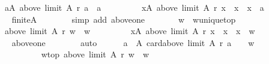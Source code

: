 \begin{isabellebody}
\ \ \ \ \ \ {\isachardoublequoteopen}{\isasymexists}a{\isasymin}A{\isachardot}{\kern0pt}\ above\ {\isacharparenleft}{\kern0pt}limit\ A\ r{\isacharparenright}{\kern0pt}\ a\ {\isacharequal}{\kern0pt}\ {\isacharbraceleft}{\kern0pt}a{\isacharbraceright}{\kern0pt}\ {\isasymand}\isanewline
\ \ \ \ \ \ \ \ {\isacharparenleft}{\kern0pt}{\isasymforall}x{\isasymin}A{\isachardot}{\kern0pt}\ above\ {\isacharparenleft}{\kern0pt}limit\ A\ r{\isacharparenright}{\kern0pt}\ x\ {\isacharequal}{\kern0pt}\ {\isacharbraceleft}{\kern0pt}x{\isacharbraceright}{\kern0pt}\ {\isasymlongrightarrow}\ x\ {\isacharequal}{\kern0pt}\ a{\isacharparenright}{\kern0pt}{\isachardoublequoteclose}\isanewline
\ \ \ \ \ \ \isamarkupfalse%
\ finite{\isacharunderscore}{\kern0pt}A\isanewline
\ \ \ \ \ \ \isamarkupfalse%
\ {\isacharparenleft}{\kern0pt}simp\ add{\isacharcolon}{\kern0pt}\ above{\isacharunderscore}{\kern0pt}one{\isacharparenright}{\kern0pt}\isanewline
\ \ \ \ \isamarkupfalse%
\ \isamarkupfalse%
\ w\ \ w{\isacharunderscore}{\kern0pt}unique{\isacharunderscore}{\kern0pt}top{\isacharcolon}{\kern0pt}\isanewline
\ \ \ \ \ \ {\isachardoublequoteopen}above\ {\isacharparenleft}{\kern0pt}limit\ A\ r{\isacharparenright}{\kern0pt}\ w\ {\isacharequal}{\kern0pt}\ {\isacharbraceleft}{\kern0pt}w{\isacharbraceright}{\kern0pt}\ {\isasymand}\isanewline
\ \ \ \ \ \ \ \ {\isacharparenleft}{\kern0pt}{\isasymforall}x{\isasymin}A{\isachardot}{\kern0pt}\ above\ {\isacharparenleft}{\kern0pt}limit\ A\ r{\isacharparenright}{\kern0pt}\ x\ {\isacharequal}{\kern0pt}\ {\isacharbraceleft}{\kern0pt}x{\isacharbraceright}{\kern0pt}\ {\isasymlongrightarrow}\ x\ {\isacharequal}{\kern0pt}\ w{\isacharparenright}{\kern0pt}{\isachardoublequoteclose}\isanewline
\ \ \ \ \ \ \isamarkupfalse%
\ above{\isacharunderscore}{\kern0pt}one\isanewline
\ \ \ \ \ \ \isamarkupfalse%
\ auto\isanewline
\ \ \ \ \isamarkupfalse%
\ {\isachardoublequoteopen}{\isacharbraceleft}{\kern0pt}a\ {\isasymin}\ A{\isachardot}{\kern0pt}\ card{\isacharparenleft}{\kern0pt}above\ {\isacharparenleft}{\kern0pt}limit\ A\ r{\isacharparenright}{\kern0pt}\ a{\isacharparenright}{\kern0pt}\ {\isasymle}\ {}{\isacharbraceright}{\kern0pt}\ {\isacharequal}{\kern0pt}\ {\isacharbraceleft}{\kern0pt}w{\isacharbraceright}{\kern0pt}{\isachardoublequoteclose}\isanewline
\ \ \ \ \isamarkupfalse%
\isanewline
\ \ \ \ \ \ \isamarkupfalse%
\isanewline
\ \ \ \ \ \ \ \ w{\isacharunderscore}{\kern0pt}top{\isacharcolon}{\kern0pt}\ {\isachardoublequoteopen}above\ {\isacharparenleft}{\kern0pt}limit\ A\ r{\isacharparenright}{\kern0pt}\ w\ {\isacharequal}{\kern0pt}\ {\isacharbraceleft}{\kern0pt}w{\isacharbraceright}{\kern0pt}{\isachardoublequoteclose}\ \isanewline

\end{isabellebody}
